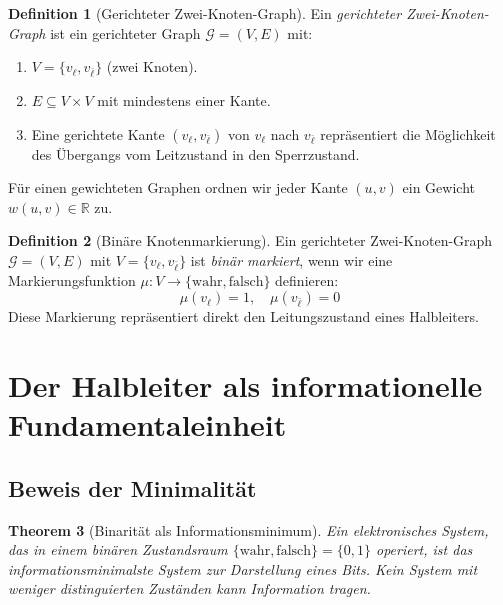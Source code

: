 \documentclass[12pt, a4paper]{article}
\newtheorem{theorem}{Theorem}[section]
\theoremstyle{definition}
\newtheorem{definition}[theorem]{Definition}
\theoremstyle{remark}
\newcommand{\R}{\mathbb{R}}
\newcommand{\Bool}{\{\mathrm{wahr}, \mathrm{falsch}\}}
\newcommand{\Graph}{\mathcal{G}}
\newcommand{\leit}{\ell}
\newcommand{\sperr}{\bar{\ell}}
\begin{document}
\begin{definition}[Gerichteter Zwei-Knoten-Graph]
\label{def:zwei_knoten_graph}
Ein \emph{gerichteter Zwei-Knoten-Graph} ist ein gerichteter Graph $\Graph = (V, E)$ mit:
\begin{enumerate}[label=(\alph*)]
  \item $V = \{v_{\leit}, v_{\sperr}\}$ (zwei Knoten).
  \item $E \subseteq V \times V$ mit mindestens einer Kante.
  \item Eine gerichtete Kante $(v_{\leit}, v_{\sperr})$ von $v_{\leit}$ nach $v_{\sperr}$ repräsentiert die Möglichkeit des Übergangs vom Leitzustand in den Sperrzustand.
\end{enumerate}

Für einen gewichteten Graphen ordnen wir jeder Kante $(u, v)$ ein Gewicht $w(u, v) \in \R$ zu.
\end{definition}

\begin{definition}[Binäre Knotenmarkierung]
\label{def:binaere_markierung}
Ein gerichteter Zwei-Knoten-Graph $\Graph = (V, E)$ mit $V = \{v_{\leit}, v_{\sperr}\}$ ist \emph{binär markiert}, wenn wir eine Markierungsfunktion $\mu: V \to \Bool$ definieren:
\[
  \mu(v_{\leit}) = 1, \quad \mu(v_{\sperr}) = 0
\]
Diese Markierung repräsentiert direkt den Leitungszustand eines Halbleiters.
\end{definition}

\section{Der Halbleiter als informationelle Fundamentaleinheit}
\label{sec:halbleiter_fundament}

\subsection{Beweis der Minimalität}
\label{subsec:minimalitaet_beweis}

\begin{theorem}[Binarität als Informationsminimum]
\label{thm:binaere_minimalitaet}
Ein elektronisches System, das in einem binären Zustandsraum $\Bool = \{0, 1\}$ operiert, ist das informationsminimalste System zur Darstellung eines Bits. Kein System mit weniger distinguierten Zuständen kann Information tragen.
\end{theorem}
\end{document}
